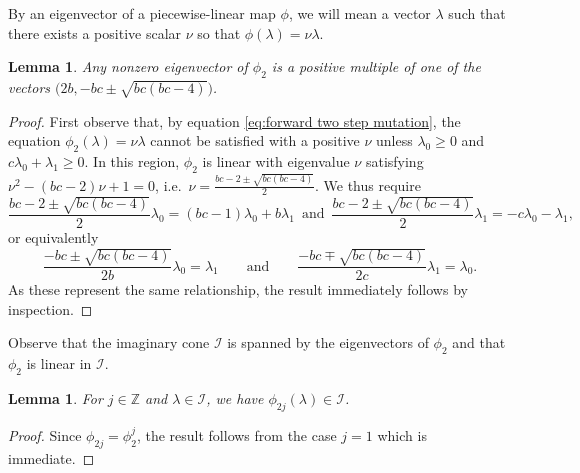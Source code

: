 \documentclass[pdflatex,sn-mathphys]{sn-jnl}%
\theoremstyle{thmstyleone}%
\newtheorem{lemma}[theorem]{Lemma}
\theoremstyle{thmstyletwo}%
\theoremstyle{thmstylethree}%
\newcommand{\cI}{\mathcal{I}}
\newcommand{\ZZ}{\mathbb{Z}}
\begin{document}
  By an eigenvector of a piecewise-linear map $\phi$, we will mean a vector $\lambda$ such that there exists a positive scalar $\nu$ so that $\phi(\lambda)=\nu\lambda$.
  \begin{lemma}
    Any nonzero eigenvector of $\phi_2$ is a positive multiple of one of the vectors $\big(2b,-bc\pm\sqrt{bc(bc-4)}\big)\!$.
  \end{lemma}
  \begin{proof}
    First observe that, by equation \eqref{eq:forward two step mutation}, the equation $\phi_2(\lambda)=\nu\lambda$ cannot be satisfied with a positive $\nu$ unless $\lambda_0\ge 0$ and $c\lambda_0+\lambda_1\ge 0$.
    In this region, $\phi_2$ is linear with eigenvalue $\nu$ satisfying $\nu^2-(bc-2)\nu+1=0$, i.e.~$\nu=\frac{bc-2\pm\sqrt{bc(bc-4)}}{2}$.
    We thus require 
    \[\frac{bc-2\pm\sqrt{bc(bc-4)}}{2}\lambda_0=(bc-1)\lambda_0+b\lambda_1\,\,\,\text{and}\,\,\,\frac{bc-2\pm\sqrt{bc(bc-4)}}{2}\lambda_1= -c\lambda_0-\lambda_1,\]
    or equivalently
    \[\frac{-bc\pm\sqrt{bc(bc-4)}}{2b}\lambda_0=\lambda_1 \qquad\text{and}\qquad \frac{-bc\mp\sqrt{bc(bc-4)}}{2c}\lambda_1=\lambda_0.\]
    As these represent the same relationship, the result immediately follows by inspection.
  \end{proof}

  Observe that the imaginary cone $\cI$ is spanned by the eigenvectors of $\phi_{2}$ and that $\phi_{2}$ is linear in $\cI$.
  \begin{lemma}
    \label{le:imaginary stability}
    For $j\in\ZZ$ and $\lambda\in\cI$, we have $\phi_{2j}(\lambda)\in\cI$.
  \end{lemma}
  \begin{proof}
    Since $\phi_{2j}=\phi_2^j$, the result follows from the case $j=1$ which is immediate.
  \end{proof}
\end{document}
